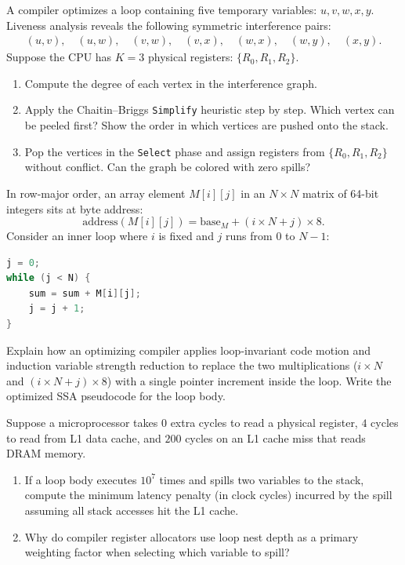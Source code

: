 \begin{exercise}
A compiler optimizes a loop containing five temporary variables: $u, v, w, x, y$.
Liveness analysis reveals the following symmetric interference pairs:
\begin{align*}
  (u, v),\quad (u, w),\quad (v, w),\quad (v, x),\quad (w, x),\quad (w, y),\quad (x, y).
\end{align*}
Suppose the CPU has $K=3$ physical registers: $\{R_0, R_1, R_2\}$.
\begin{enumerate}
  \item Compute the degree of each vertex in the interference graph.
  \item Apply the Chaitin--Briggs \texttt{Simplify} heuristic step by step. Which
  vertex can be peeled first? Show the order in which vertices are pushed onto
  the stack.
  \item Pop the vertices in the \texttt{Select} phase and assign registers from
  $\{R_0, R_1, R_2\}$ without conflict. Can the graph be colored with zero spills?
\end{enumerate}
\end{exercise}

\begin{exercise}
In row-major order, an array element $M[i][j]$ in an $N \times N$ matrix of 64-bit
integers sits at byte address:
\[
  \text{address}(M[i][j]) = \text{base}_M + (i \times N + j) \times 8.
\]
Consider an inner loop where $i$ is fixed and $j$ runs from $0$ to $N-1$:
\begin{lstlisting}[language=C]
j = 0;
while (j < N) {
    sum = sum + M[i][j];
    j = j + 1;
}
\end{lstlisting}
Explain how an optimizing compiler applies loop-invariant code motion and
induction variable strength reduction to replace the two multiplications
($i \times N$ and $(i \times N + j) \times 8$) with a single pointer increment
inside the loop. Write the optimized SSA pseudocode for the loop body.
\end{exercise}

\begin{exercise}
Suppose a microprocessor takes $0$ extra cycles to read a physical register,
$4$ cycles to read from L1 data cache, and $200$ cycles on an L1 cache miss that
reads DRAM memory.
\begin{enumerate}
  \item If a loop body executes $10^7$ times and spills two variables to the
  stack, compute the minimum latency penalty (in clock cycles) incurred by the
  spill assuming all stack accesses hit the L1 cache.
  \item Why do compiler register allocators use loop nest depth as a primary
  weighting factor when selecting which variable to spill?
\end{enumerate}
\end{exercise}
